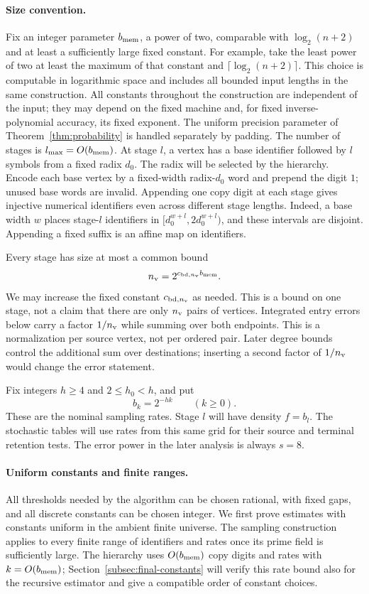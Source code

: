 \documentclass[11pt]{article}
\numberwithin{equation}{section}
\theoremstyle{definition}
\theoremstyle{remark}
\begin{document}
\paragraph{Size convention.}
Fix an integer parameter ${b_{\rm mem}}$, a power of two, comparable with
$\log_2(n+2)$ and at least a sufficiently large fixed constant.
For example, take the least power of two at least the maximum of that
constant and $\lceil\log_2(n+2)\rceil$.  This choice is computable in
logarithmic space and includes all bounded input lengths in the same
construction. All constants throughout the
construction are independent of the input; they may depend on the fixed
machine and, for fixed inverse-polynomial accuracy, its fixed exponent.
The uniform precision parameter of Theorem~\ref{thm:probability} is
handled separately by padding. The number of stages is ${l_{\rm max}}=O({b_{\rm mem}})$. At stage $l$, a vertex has
a base identifier followed by $l$ symbols from a fixed radix ${d}_0$.
The radix will be selected by the hierarchy. Encode each base vertex by
a fixed-width radix-${d}_0$ word and prepend the digit $1$; unused base
words are invalid. Appending one copy digit at each stage gives
injective numerical identifiers even across different stage lengths.
Indeed, a base width $w$ places stage-$l$ identifiers in
$[{d}_0^{w+l},2{d}_0^{w+l})$, and these intervals are disjoint.
Appending a fixed suffix is an affine map on identifiers.

Every stage has size at most a common bound
\[
{n_{\rm v}}=2^{{c_{\mathrm{bd},n_{\rm v}}}{b_{\rm mem}}}.
\]
We may increase the fixed constant ${c_{\mathrm{bd},n_{\rm v}}}$ as needed. This is a bound on
one stage, not a claim that there are only ${n_{\rm v}}$ pairs of vertices.
Integrated entry errors below carry a factor $1/{n_{\rm v}}$ while summing over both endpoints. This is a normalization per source vertex, not per ordered pair. Later degree bounds control the additional sum over destinations; inserting a second factor of $1/{n_{\rm v}}$ would change the error statement.

Fix integers ${h}\ge4$ and $2\le h_0<{h}$, and put
\[
b_k=2^{-{h}k}\qquad(k\ge0).
\]
These are the nominal sampling rates. Stage $l$ will have density
$f=b_l$. The stochastic tables will use rates from this same grid
for their source and terminal retention tests. The error power in
the later analysis is always $s=8$.

\paragraph{Uniform constants and finite ranges.}
All thresholds needed by the algorithm can be chosen rational, with
fixed gaps, and all discrete constants can be chosen integer. We
first prove estimates with constants uniform in the ambient finite
universe. The sampling construction applies to every finite range of
identifiers and rates once its prime field is sufficiently large.
The hierarchy uses $O({b_{\rm mem}})$ copy digits and rates with $k=O({b_{\rm mem}})$;
Section~\ref{subsec:final-constants} will verify this rate bound also
for the recursive estimator and give a compatible order of constant
choices.
\end{document}
